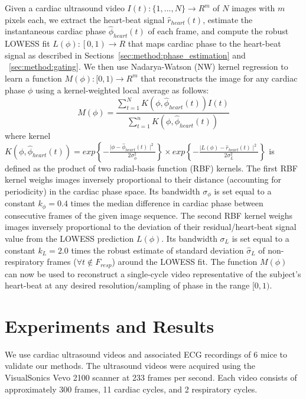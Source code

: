 \documentclass[runningheads,a4paper]{llncs}
\begin{document}
Given a cardiac ultrasound video $I(t) : \{1, ..., N\} \to R^m$ of $N$ images with $m$ pixels each, we extract the heart-beat signal $\hat{r}_{heart}(t)$, estimate the instantaneous cardiac phase $\hat{\phi}_{heart}(t)$ of each frame, and compute the robust LOWESS fit $L(\phi) : \left [  0, 1\right ) \to R$ that maps cardiac phase to the heart-beat signal as described in Sections~\ref{sec:method:phase_estimation} and ~\ref{sec:method:gating}. We then use Nadarya-Watson (NW) kernel regression \cite{Bishop2006} to learn a function $M(\phi): [0, 1) \to R^m $ that reconstructs the image for any cardiac phase $\phi$ using a kernel-weighted local average as follows:
\begin{equation}
M(\phi) = \frac{\sum_{t = 1}^{N} K \left( \phi, \hat{\phi}_{heart}(t) \right) I(t)}{\sum_{t = 1}^{n} K \left( \phi, \hat{\phi}_{heart}(t) \right)} 
\end{equation}
where kernel $K\left( \phi, \hat{\phi}_{heart}(t) \right) = exp\left \{ -\frac{ \mid \phi - \hat{\phi}_{heart}(t) \mid^2}{2  \sigma^2_\phi} \right \} \times exp\left \{ -\frac{ \mid L(\phi) - \hat{r}_{heart}(t) \mid^2}{2  \sigma^2_{L}} \right \}$ is defined as the product of two radial-basis function (RBF) kernels. The first RBF kernel  weighs images inversely proportional to their distance (accounting for periodicity) in the cardiac phase space. Its bandwidth $\sigma_\phi$ is set equal to a constant $k_\phi = 0.4$ times the median difference in cardiac phase between consecutive frames of the given image sequence. The second RBF kernel weighs images inversely proportional to the deviation of their residual/heart-beat signal value from the LOWESS prediction $L(\phi)$. Its bandwidth $\sigma_{L}$ is set equal to a constant $k_L = 2.0$ times the robust estimate of standard deviation $\hat{\sigma}_{L}$ of non-respiratory frames ($\forall t \notin F_{resp}$) around the LOWESS fit. The function $M(\phi)$ can now be used to reconstruct a single-cycle video representative of the subject's heart-beat at any desired resolution/sampling of phase in the range $[0, 1)$. 
%
\vspace{-0.3cm}
\section{Experiments and Results}
\label{sec:results}
\vspace{-0.3cm}
%
We use cardiac ultrasound videos and associated ECG recordings of 6 mice to validate our methods. The ultrasound videos were acquired using the VisualSonics Vevo 2100 scanner at 233 frames per second. Each video consists of approximately 300 frames, 11 cardiac cycles, and 2 respiratory cycles.
\end{document}
